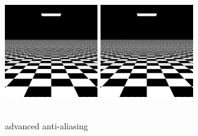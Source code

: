 \documentclass[acmtog]{acmart}
\begin{document}
\begin{figure}[h]
	\includegraphics[width=4cm,height=5cm]{stratified_random_sample}
	\includegraphics[width=4cm,height=5cm]{Halton}
	\caption{advanced anti-aliasing}
\end{figure}
\end{document}
